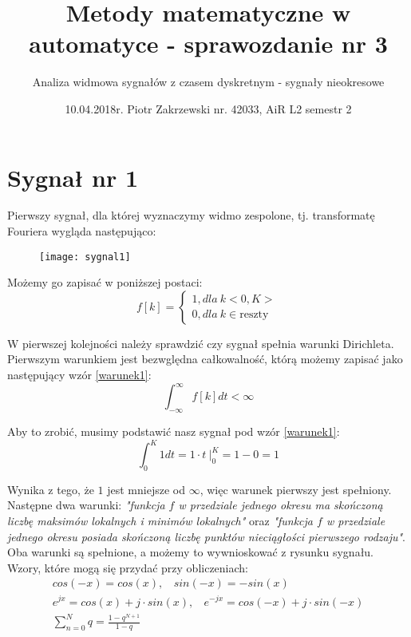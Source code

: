 \documentclass[11pt,a4paper]{article}
\title{Metody matematyczne w automatyce - sprawozdanie nr 3}
\author{Analiza widmowa sygnałów z czasem dyskretnym - sygnały nieokresowe}
\date{10.04.2018r. Piotr Zakrzewski nr. 42033, AiR L2 semestr 2}
\numberwithin{liczba1}{liczba2}
\newcommand\tab[1][1cm]{\hspace*{#1}}
\begin{document}
\maketitle
\section{Sygnał nr 1}

\tab Pierwszy sygnał, dla której wyznaczymy widmo zespolone, tj. transformatę Fouriera wygląda następująco:
\begin{figure}[h]
\centering
\texttt{[image: sygnal1]}
\end{figure}

Możemy go zapisać w poniższej postaci:
\[
    f[k] =\left\{
                \begin{array}{ll}
                  1, dla\ k <0,K> \\
                  0, dla\ k \in \text{reszty}
                \end{array}
\label{sygnal1klamra}
\tag{1.1}
              \right.
\]

W pierwszej kolejności należy sprawdzić czy sygnał spełnia warunki Dirichleta. Pierwszym warunkiem jest bezwględna całkowalność, którą możemy zapisać jako następujący wzór \ref{warunek1}: \\
\begin{equation}
\int_{-\infty}^{\infty} f[k] dt < \infty
\label{warunek1}
\end{equation}

Aby to zrobić, musimy podstawić nasz sygnał pod wzór \ref{warunek1}: \\
\begin{equation}
\int_{0}^{K} 1 dt = 1 \cdot t \ \Bigg|^K_0 = 1 - 0 = 1
\end{equation}

Wynika z tego, że $ 1 $ jest mniejsze od $ \infty $, więc warunek pierwszy jest spełniony. Następne dwa warunki: \textit{"funkcja $ f $ w przedziale jednego okresu ma skończoną liczbę maksimów lokalnych i minimów lokalnych"} oraz \textit{"funkcja $ f $ w przedziale jednego okresu posiada skończoną liczbę punktów nieciągłości pierwszego rodzaju"}. Oba warunki są spełnione, a możemy to wywnioskować z rysunku sygnału. \\

Wzory, które mogą się przydać przy obliczeniach:
\begin{gather*}
cos(-x) = cos(x), \ \ \ \ sin(-x) = -sin(x) \\
e^{jx} = cos(x) + j \cdot sin(x), \ \ \ \ e^{-jx} = cos(-x) + j \cdot sin(-x) \\
\sum_{n=0}^{N} q = \frac{1 - q^{N+1}}{1 - q}
\end{gather*}
\end{document}
